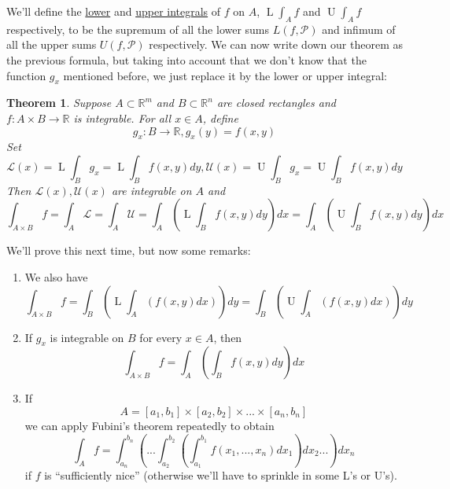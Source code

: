 \documentclass{article}
\newtheorem{theorem}{Theorem}
\newcommand{\reals}[0]{\mathbb{R}}
\newcommand{\mc}[1]{\mathcal{#1}}
\newcommand{\loint}[0]{\operatorname{L}\int}
\newcommand{\hiint}[0]{\operatorname{U}\int}
\begin{document}
We'll define the \underline{lower} and \underline{upper integrals} of \(f\) on \(A\), \(\loint_Af\) and \(\hiint_Af\) respectively, to be the supremum of all the lower sums \(L(f, \mc{P})\) and infimum of all the upper sums \(U(f, \mc{P})\) respectively. We can now write down our theorem as the previous formula, but taking into account that we don't know that the function \(g_x\) mentioned before, we just replace it by the lower or upper integral:
\begin{theorem}
  Suppose \(A \subset \reals^m\) and \(B \subset \reals^n\) are closed rectangles and \(f: A \times B \to \reals\) is integrable. For all \(x \in A\), define
  \begin{equation}g_x: B \to \reals, g_x(y) = f(x, y)\end{equation}
  Set
  \begin{equation}\mc{L}(x) = \loint_Bg_x = \loint_Bf(x, y)dy, \mc{U}(x) = \hiint_Bg_x = \hiint_Bf(x, y)dy\end{equation}
  Then \(\mc{L}(x), \mc{U}(x)\) are integrable on \(A\) and
  \begin{equation}\int_{A \times B}f = \int_A\mc{L} = \int_A\mc{U} = \int_A\left(\loint_Bf(x, y)dy\right)dx = \int_A\left(\hiint_Bf(x, y)dy\right)dx\end{equation}
\end{theorem}
We'll prove this next time, but now some remarks:
\begin{enumerate}

  \item We also have
  \begin{equation}\int_{A \times B}f = \int_B\left(\loint_A(f(x, y)dx)\right)dy = \int_B\left(\hiint_A(f(x, y)dx)\right)dy\end{equation}

  \item If \(g_x\) is integrable on \(B\) for every \(x \in A\), then
  \begin{equation}\int_{A \times B}f = \int_A\left(\int_Bf(x, y)dy\right)dx\end{equation}

  \item If \begin{equation}A = [a_1, b_1] \times [a_2, b_2] \times ... \times [a_n, b_n]\end{equation}
  we can apply Fubini's theorem repeatedly to obtain
  \begin{equation}\int_Af = \int_{a_n}^{b_n} \left(... \int_{a_2}^{b_2}\left(\int_{a_1}^{b_1}f(x_1,...,x_n)dx_1\right)dx_2...\right) dx_n\end{equation}
  if \(f\) is ``sufficiently nice'' (otherwise we'll have to sprinkle in some L's or U's).

\end{enumerate}
\end{document}
